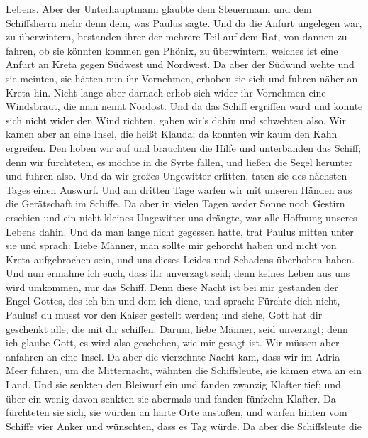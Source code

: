 Lebens.  Aber der Unterhauptmann glaubte dem Steuermann und
dem Schiffsherrn mehr denn dem, was Paulus sagte.  Und da
die Anfurt ungelegen war, zu überwintern, bestanden ihrer der mehrere
Teil auf dem Rat, von dannen zu fahren, ob sie könnten kommen gen
Phönix, zu überwintern, welches ist eine Anfurt an Kreta gegen Südwest
und Nordwest.  Da aber der Südwind wehte und sie meinten,
sie hätten nun ihr Vornehmen, erhoben sie sich und fuhren näher an Kreta
hin.  Nicht lange aber darnach erhob sich wider ihr
Vornehmen eine Windsbraut, die man nennt Nordost.  Und da
das Schiff ergriffen ward und konnte sich nicht wider den Wind richten,
gaben wir's dahin und schwebten also.  Wir kamen aber an
eine Insel, die heißt Klauda; da konnten wir kaum den Kahn ergreifen.
 Den hoben wir auf und brauchten die Hilfe und unterbanden
das Schiff; denn wir fürchteten, es möchte in die Syrte fallen, und
ließen die Segel herunter und fuhren also.  Und da wir
großes Ungewitter erlitten, taten sie des nächsten Tages einen Auswurf.
 Und am dritten Tage warfen wir mit unseren Händen aus die
Gerätschaft im Schiffe.  Da aber in vielen Tagen weder
Sonne noch Gestirn erschien und ein nicht kleines Ungewitter uns
drängte, war alle Hoffnung unseres Lebens dahin.  Und da
man lange nicht gegessen hatte, trat Paulus mitten unter sie und sprach:
Liebe Männer, man sollte mir gehorcht haben und nicht von Kreta
aufgebrochen sein, und uns dieses Leides und Schadens überhoben haben.
 Und nun ermahne ich euch, dass ihr unverzagt seid; denn
keines Leben aus uns wird umkommen, nur das Schiff.  Denn
diese Nacht ist bei mir gestanden der Engel Gottes, des ich bin und dem
ich diene,  und sprach: Fürchte dich nicht, Paulus! du
musst vor den Kaiser gestellt werden; und siehe, Gott hat dir geschenkt
alle, die mit dir schiffen.  Darum, liebe Männer, seid
unverzagt; denn ich glaube Gott, es wird also geschehen, wie mir gesagt
ist.  Wir müssen aber anfahren an eine Insel. 
Da aber die vierzehnte Nacht kam, dass wir im Adria-Meer fuhren, um die
Mitternacht, wähnten die Schiffsleute, sie kämen etwa an ein Land.
 Und sie senkten den Bleiwurf ein und fanden zwanzig
Klafter tief; und über ein wenig davon senkten sie abermals und fanden
fünfzehn Klafter.  Da fürchteten sie sich, sie würden an
harte Orte anstoßen, und warfen hinten vom Schiffe vier Anker und
wünschten, dass es Tag würde.  Da aber die Schiffsleute die
